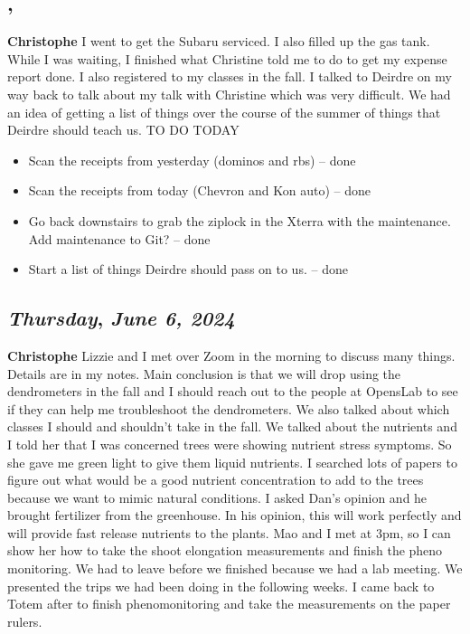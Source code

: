 \subsection*{\weekday, \day}
\textbf {Christophe}
I went to get the Subaru serviced. I also filled up the gas tank. While I was waiting, I finished what Christine told me to do to get my expense report done. I also registered to my classes in the fall. I talked to Deirdre on my way back to talk about my talk with Christine which was very difficult. We had an idea of getting a list of things over the course of the summer of things that Deirdre should teach us.
TO DO TODAY
\begin{itemize}
    \item Scan the receipts from yesterday (dominos and rbs) -- done 
    \item Scan the receipts from today (Chevron and Kon auto) -- done
    \item Go back downstairs to grab the ziplock in the Xterra with the maintenance. Add maintenance to Git? -- done 
    \item Start a list of things Deirdre should pass on to us. -- done 
\end{itemize}

\def\day{\textit{June 6, 2024}}
\def\weekday{\textit{Thursday}}
\subsection*{\weekday, \day}
\textbf {Christophe}
Lizzie and I met over Zoom in the morning to discuss many things. Details are in my notes. Main conclusion is that we will drop using the dendrometers in the fall and I should reach out to the people at OpensLab to see if they can help me troubleshoot the dendrometers. We also talked about which classes I should and shouldn't take in the fall. We talked about the nutrients and I told her that I was concerned trees were showing nutrient stress symptoms. So she gave me green light to give them liquid nutrients. I searched lots of papers to figure out what would be a good nutrient concentration to add to the trees because we want to mimic natural conditions. I asked Dan's opinion and he brought fertilizer from the greenhouse. In his opinion, this will work perfectly and will provide fast release nutrients to the plants. 
Mao and I met at 3pm, so I can show her how to take the shoot elongation measurements and finish the pheno monitoring. We had to leave before we finished because we had a lab meeting. We presented the trips we had been doing in the following weeks. I came back to Totem after to finish phenomonitoring and take the measurements on the paper rulers. 

